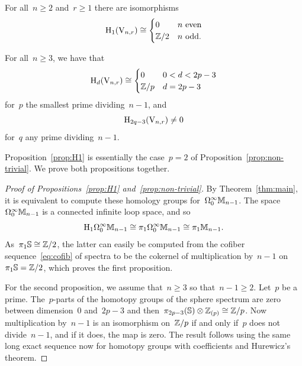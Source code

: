 \begin{proposition}\label{prop:H1}
For all~$n\geqslant 2$ and~$r\geqslant1$ there are isomorphisms
\[
\mathrm{H}_1(\mathrm{V}_{n,r})\cong
\begin{cases}
0 		& n\text{ even}\\
\mathbb{Z}/2 	& n\text{ odd.}\\
\end{cases}
\]
\end{proposition}

\begin{proposition}\label{prop:non-trivial}
For all~$n\geqslant 3$, we have that
\[
\mathrm{H}_d(\mathrm{V}_{n,r})\cong
\begin{cases}
0 & 0<d<2p-3\\
\mathbb{Z}/p & d=2p-3
\end{cases}
\]
for~$p$ the smallest prime dividing~$n-1$, and 
\[
\mathrm{H}_{2q-3}(\mathrm{V}_{n,r})\neq 0
\]
for~$q$ any prime dividing~$n-1$.
\end{proposition}

Proposition~\ref{prop:H1} is essentially the case~$p=2$ of Proposition~\ref{prop:non-trivial}. We prove both propositions together. 

\begin{proof}[Proof of Propositions~\ref{prop:H1} and~\ref{prop:non-trivial}]
By Theorem~\ref{thm:main}, it is equivalent to compute these homology groups for~$\Omega^\infty_0\mathbb{M}_{n-1}$. 
The space~$\Omega^\infty_0\mathbb{M}_{n-1}$ is a connected infinite loop space, and so
\[
\mathrm{H}_1\Omega^\infty_0\mathbb{M}_{n-1}
\cong\pi_1\Omega^\infty_0\mathbb{M}_{n-1}
\cong\pi_1\mathbb{M}_{n-1}.
\]
As~$\pi_1\mathbb{S}\cong \mathbb{Z}/2$, the latter can easily be computed from the cofiber sequence~\eqref{eq:cofib} of spectra to be the cokernel of multiplication by~$n-1$ on~$\pi_1\mathbb{S}=\mathbb{Z}/2$, which proves the first proposition.

For the second proposition, we assume that~$n\geqslant 3$ so that~$n-1\geqslant 2$. Let~$p$ be a prime. The~$p$-parts of the homotopy groups of the sphere spectrum are zero between dimension~$0$ and~\hbox{$2p-3$} and then~\hbox{$\pi_{2p-3}(\mathbb{S})\otimes \mathbb{Z}_{(p)}\cong \mathbb{Z}/p$}. 
Now multiplication by~$n-1$ is an isomorphism on~$\mathbb{Z}/p$ if and only if~$p$ does not divide~$n-1$, and if it does, the map is zero. The result follows using the same long exact sequence now for homotopy groups with coefficients and Hurewicz's theorem.   
\end{proof}

